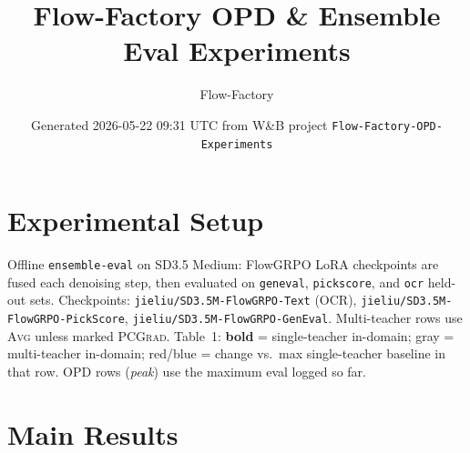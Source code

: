 \documentclass[11pt]{article}
\title{Flow-Factory OPD \& Ensemble Eval Experiments}
\author{Flow-Factory}
\date{Generated 2026-05-22 09:31 UTC from W\&B project \texttt{Flow-Factory-OPD-Experiments}}
\begin{document}
\maketitle

\section{Experimental Setup}

\begin{sloppypar}
Offline \texttt{ensemble-eval} on SD3.5 Medium: FlowGRPO LoRA checkpoints
are fused each denoising step, then evaluated on \texttt{geneval},
\texttt{pickscore}, and \texttt{ocr} held-out sets.
Checkpoints: \texttt{jieliu/SD3.5M-FlowGRPO-Text} (OCR),
\texttt{jieliu/SD3.5M-FlowGRPO-PickScore},
\texttt{jieliu/SD3.5M-FlowGRPO-GenEval}.
Multi-teacher rows use \textsc{Avg} unless marked \textsc{PCGrad}.
Table~1: \textbf{bold} = single-teacher in-domain; gray = multi-teacher
in-domain; red/blue = change vs.\ max single-teacher baseline in that row.
OPD rows (\textit{peak}) use the maximum eval logged so far.
\end{sloppypar}

\section{Main Results}
\end{document}
